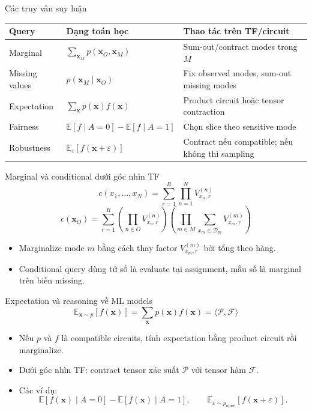 \begin{frame}{Các truy vấn suy luận}
\small
\renewcommand{\arraystretch}{1.22}
\begin{tabular}{p{}p{}p{}}
\toprule
\textbf{Query} & \textbf{Dạng toán học} & \textbf{Thao tác trên TF/circuit} \\
\midrule
Marginal & $\sum_{\mathbf{x}_M}p(\mathbf{x}_O,\mathbf{x}_M)$ & Sum-out/contract modes trong $M$ \\
Missing values & $p(\mathbf{x}_M\mid\mathbf{x}_O)$ & Fix observed modes, sum-out missing modes \\
Expectation & $\sum_{\mathbf{x}}p(\mathbf{x})f(\mathbf{x})$ & Product circuit hoặc tensor contraction \\
Fairness & $\mathbb{E}[f\mid A=0]-\mathbb{E}[f\mid A=1]$ & Chọn slice theo sensitive mode \\
Robustness & $\mathbb{E}_{\varepsilon}[f(\mathbf{x}+\varepsilon)]$ & Contract nếu compatible; nếu không thì sampling \\
\bottomrule
\end{tabular}
\end{frame}

\begin{frame}{Marginal và conditional dưới góc nhìn TF}
\[
    c(x_1,\ldots,x_N)
    =
    \sum_{r=1}^{R}\prod_{n=1}^{N}V^{(n)}_{x_n,r}
\]
\[
    c(\mathbf{x}_O)
    =
    \sum_{r=1}^{R}
    \left(\prod_{n\in O}V^{(n)}_{x_n,r}\right)
    \left(\prod_{m\in M}\sum_{x_m\in\mathcal{D}_m}V^{(m)}_{x_m,r}\right)
\]
\begin{itemize}
    \item Marginalize mode $m$ bằng cách thay factor $V^{(m)}_{x_m,r}$ bởi tổng theo hàng.
    \item Conditional query dùng tử số là evaluate tại assignment, mẫu số là marginal trên biến missing.
\end{itemize}
\end{frame}

\begin{frame}{Expectation và reasoning về ML models}
\[
    \mathbb{E}_{\mathbf{x}\sim p}[f(\mathbf{x})]
    =
    \sum_{\mathbf{x}}p(\mathbf{x})f(\mathbf{x})
    =
    \langle\mathcal{P},\mathcal{F}\rangle
\]
\begin{itemize}
    \item Nếu $p$ và $f$ là compatible circuits, tính expectation bằng product circuit rồi marginalize.
    \item Dưới góc nhìn TF: contract tensor xác suất $\mathcal{P}$ với tensor hàm $\mathcal{F}$.
    \item Các ví dụ:
    \[
        \mathbb{E}[f(\mathbf{x})\mid A=0]
        -
        \mathbb{E}[f(\mathbf{x})\mid A=1],
        \qquad
        \mathbb{E}_{\varepsilon\sim p_{\mathrm{noise}}}[f(\mathbf{x}+\varepsilon)].
    \]
\end{itemize}
\end{frame}

